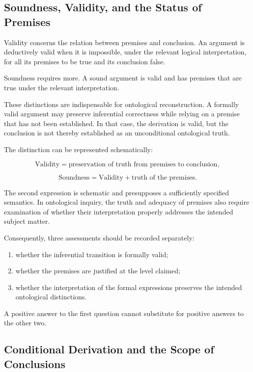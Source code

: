 \subsection{Soundness, Validity, and the Status of Premises}

Validity concerns the relation between premises and conclusion.
An argument is deductively valid when it is impossible, under the
relevant logical interpretation, for all its premises to be true
and its conclusion false.

Soundness requires more. A sound argument is valid and has premises
that are true under the relevant interpretation.

These distinctions are indispensable for ontological reconstruction.
A formally valid argument may preserve inferential correctness
while relying on a premise that has not been established. In that
case, the derivation is valid, but the conclusion is not thereby
established as an unconditional ontological truth.

The distinction can be represented schematically:

\[
\text{Validity}
=
\text{preservation of truth from premises to conclusion},
\]

\[
\text{Soundness}
=
\text{Validity}
+
\text{truth of the premises}.
\]

The second expression is schematic and presupposes a sufficiently
specified semantics. In ontological inquiry, the truth and
adequacy of premises also require examination of whether their
interpretation properly addresses the intended subject matter.

Consequently, three assessments should be recorded separately:

\begin{enumerate}
    \item whether the inferential transition is formally valid;
    \item whether the premises are justified at the level claimed;
    \item whether the interpretation of the formal expressions
    preserves the intended ontological distinctions.
\end{enumerate}

A positive answer to the first question cannot substitute for
positive answers to the other two.

\subsection{Conditional Derivation and the Scope of Conclusions}

